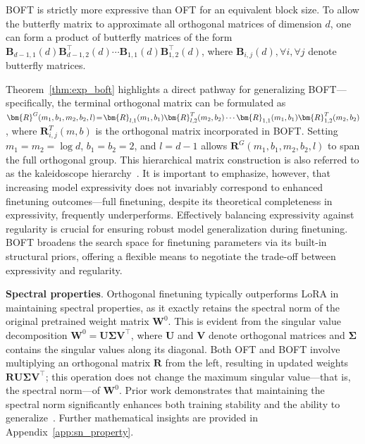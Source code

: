 \begin{theorem}\label{thm:exp_boft}
    BOFT is strictly more expressive than OFT for an equivalent block size. To allow the butterfly matrix to approximate all orthogonal matrices of dimension $d$, one can form a product of butterfly matrices of the form $\bm{B}_{d-1,1}(d)\bm{B}^\top_{d-1,2}(d)\cdots\bm{B}_{1,1}(d)\bm{B}^\top_{1,2}(d)$, where $\bm{B}_{i,j}(d),\forall i,\forall j$ denote butterfly matrices.
\end{theorem}

Theorem~\ref{thm:exp_boft} highlights a direct pathway for generalizing BOFT—specifically, the terminal orthogonal matrix can be formulated as $\thickmuskip=2mu \medmuskip=2mu \bm{R}^G(m_1,b_1,m_2,b_2,l)=\bm{R}_{l,1}(m_1,b_1)\bm{R}_{l,2}^T(m_2,b_2)\cdots\bm{R}_{1,1}(m_1,b_1)\bm{R}_{1,2}^T(m_2,b_2)$, where $\bm{R}_{i,j}^T(m,b)$ is the orthogonal matrix incorporated in BOFT. Setting $m_1=m_2=\log d$, $b_1=b_2=2$, and $l=d-1$ allows $\bm{R}^G(m_1,b_1,m_2,b_2,l)$ to span the full orthogonal group. This hierarchical matrix construction is also referred to as the kaleidoscope hierarchy~\cite{dao2019kaleidoscope}. It is important to emphasize, however, that increasing model expressivity does not invariably correspond to enhanced finetuning outcomes—full finetuning, despite its theoretical completeness in expressivity, frequently underperforms. Effectively balancing expressivity against regularity is crucial for ensuring robust model generalization during finetuning. BOFT broadens the search space for finetuning parameters via its built-in structural priors, offering a flexible means to negotiate the trade-off between expressivity and regularity.

\textbf{Spectral properties}. Orthogonal finetuning typically outperforms LoRA in maintaining spectral properties, as it exactly retains the spectral norm of the original pretrained weight matrix $\bm{W}^0$. This is evident from the singular value decomposition $\bm{W}^0=\bm{U}\bm{\Sigma}\bm{V}^\top$, where $\bm{U}$ and $\bm{V}$ denote orthogonal matrices and $\bm{\Sigma}$ contains the singular values along its diagonal. Both OFT and BOFT involve multiplying an orthogonal matrix $\bm{R}$ from the left, resulting in updated weights $\bm{R}\bm{U}\bm{\Sigma}\bm{V}^\top$; this operation does not change the maximum singular value—that is, the spectral norm—of $\bm{W}^0$. Prior work demonstrates that maintaining the spectral norm significantly enhances both training stability and the ability to generalize~\cite{miyato2018spectral,yoshida2017spectral}. Further mathematical insights are provided in Appendix~\ref{app:sn_property}.

